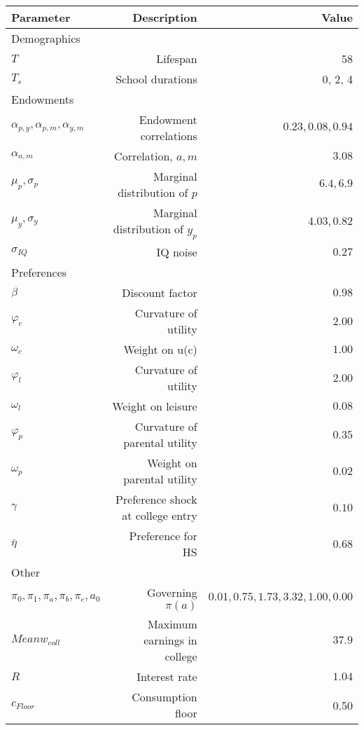 \begin{tabular}{lrr}
\hline
Parameter & Description  & Value  \\
\hline
Demographics &   &   \\
$T$ & Lifespan  & 58  \\
$T_{s}$ & School durations  & 0, 2, 4  \\
Endowments &   &   \\
$\alpha_{p,y}, \alpha_{p,m}, \alpha_{y,m}$ & Endowment correlations  & $0.23, 0.08, 0.94$  \\
$\alpha_{a,m}$ & Correlation, $a,m$  & $3.08$  \\
$\mu_{p}, \sigma_{p}$ & Marginal distribution of $p$  & $6.4, 6.9$  \\
$\mu_{y}, \sigma_{y}$ & Marginal distribution of $y_{p}$  & $4.03, 0.82$  \\
$\sigma_{IQ}$ & IQ noise  & $0.27$  \\
Preferences &   &   \\
$\beta$ & Discount factor  & $0.98$  \\
$\varphi_{c}$ & Curvature of utility  & $2.00$  \\
$\omega_{c}$ & Weight on u(c)  & $1.00$  \\
$\varphi_{l}$ & Curvature of utility  & $2.00$  \\
$\omega_{l}$ & Weight on leisure  & $0.08$  \\
$\varphi_{p}$ & Curvature of parental utility  & $0.35$  \\
$\omega_{p}$ & Weight on parental utility  & $0.02$  \\
$\gamma$ & Preference shock at college entry  & $0.10$  \\
$\bar{\eta}$ & Preference for HS  & $0.68$  \\
Other &   &   \\
$\pi_{0}, \pi_{1}, \pi_{a}, \pi_{b}, \pi_{c}, a_{0}$ & Governing $\pi(a)$  & $0.01, 0.75, 1.73, 3.32, 1.00, 0.00$  \\
$Mean w_{coll}$ & Maximum earnings in college  & $37.9$  \\
$R$ & Interest rate  & $1.04$  \\
$c_{Floor}$ & Consumption floor  & 0.50  \\
\hline
\end{tabular}%
